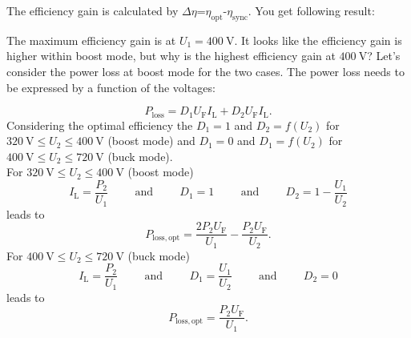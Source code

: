 \begin{solutionblock}
    The efficiency gain is calculated by $\Delta \eta$=$\eta_\mathrm{opt}$-$\eta_\mathrm{sync}$.
    You get following result:

    
    
    The maximum efficiency gain is at $U_\mathrm{1}=\SI{400}{\volt}$.
    It looks like the efficiency gain is higher within boost mode, but why is the highest efficiency gain at $\SI{400}{\volt}$?
    Let's consider the power loss at boost mode for the two cases. The power loss needs to be expressed by a function of the voltages:

    \begin{equation}
        P_\mathrm{loss}=D_1 U_\mathrm{F} I_\mathrm{L} + D_2 U_\mathrm{F} I_\mathrm{L}.
        \label{eq:ploss2}
    \end{equation}
    Considering the optimal efficiency the $D_1=1$ and $D_2=f(U_\mathrm{2})$ for $\SI{320}{\volt} \leq U_\mathrm{2} \leq \SI{400}{\volt}$ 
    (boost mode) and $D_1=0$ and $D_1=f(U_\mathrm{2})$ for $\SI{400}{\volt} \le U_\mathrm{2} \leq \SI{720}{\volt}$ (buck mode). \\
    For $\SI{320}{\volt} \leq U_\mathrm{2} \leq \SI{400}{\volt}$ (boost mode) 
    \begin{equation}
        I_\mathrm{L}=\frac{P_\mathrm{2}}{U_\mathrm{1}} 
        \hspace{1cm} \mathrm{and} \hspace{1cm}
        D_1=1
        \hspace{1cm} \mathrm{and} \hspace{1cm}
        D_2=1-\frac{U_\mathrm{1}}{U_\mathrm{2}} 
    \end{equation}
    leads to
    \begin{equation}
        P_\mathrm{loss,opt}=\frac{2 P_\mathrm{2} U_\mathrm{F}}{U_\mathrm{1}} - \frac{P_\mathrm{2} U_\mathrm{F}}{U_\mathrm{2}}.
        \label{eq:Plossoptboost}
    \end{equation}
    For $\SI{400}{\volt} \le U_\mathrm{2} \leq \SI{720}{\volt}$ (buck mode)
    \begin{equation}
        I_\mathrm{L}=\frac{P_\mathrm{2}}{U_\mathrm{1}} 
        \hspace{1cm} \mathrm{and} \hspace{1cm}
        D_1=\frac{U_\mathrm{1}}{U_\mathrm{2}}
        \hspace{1cm} \mathrm{and} \hspace{1cm}
        D_2=0 
    \end{equation}
    leads to
    \begin{equation}
        P_\mathrm{loss,opt}=\frac{P_\mathrm{2} U_\mathrm{F}}{U_\mathrm{1}}.
        \label{eq:Plossoptbuck}
    \end{equation}


\end{solutionblock}
